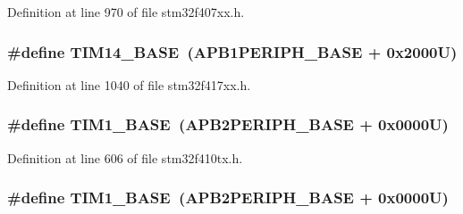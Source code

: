 Definition at line 970 of file stm32f407xx.\+h.

\subsubsection[{\texorpdfstring{T\+I\+M14\+\_\+\+B\+A\+SE}{TIM14_BASE}}]{\setlength{\rightskip}{0pt plus 5cm}\#define T\+I\+M14\+\_\+\+B\+A\+SE~({\bf A\+P\+B1\+P\+E\+R\+I\+P\+H\+\_\+\+B\+A\+SE} + 0x2000\+U)}\hypertarget{group___peripheral__registers__structures_ga862855347d6e1d92730dfe17ee8e90b8}{}\label{group___peripheral__registers__structures_ga862855347d6e1d92730dfe17ee8e90b8}


Definition at line 1040 of file stm32f417xx.\+h.

\subsubsection[{\texorpdfstring{T\+I\+M1\+\_\+\+B\+A\+SE}{TIM1_BASE}}]{\setlength{\rightskip}{0pt plus 5cm}\#define T\+I\+M1\+\_\+\+B\+A\+SE~({\bf A\+P\+B2\+P\+E\+R\+I\+P\+H\+\_\+\+B\+A\+SE} + 0x0000\+U)}\hypertarget{group___peripheral__registers__structures_gaf8aa324ca5011b8173ab16585ed7324a}{}\label{group___peripheral__registers__structures_gaf8aa324ca5011b8173ab16585ed7324a}


Definition at line 606 of file stm32f410tx.\+h.

\subsubsection[{\texorpdfstring{T\+I\+M1\+\_\+\+B\+A\+SE}{TIM1_BASE}}]{\setlength{\rightskip}{0pt plus 5cm}\#define T\+I\+M1\+\_\+\+B\+A\+SE~({\bf A\+P\+B2\+P\+E\+R\+I\+P\+H\+\_\+\+B\+A\+SE} + 0x0000\+U)}\hypertarget{group___peripheral__registers__structures_gaf8aa324ca5011b8173ab16585ed7324a}{}\label{group___peripheral__registers__structures_gaf8aa324ca5011b8173ab16585ed7324a}


